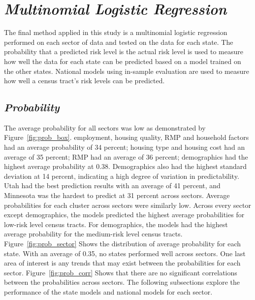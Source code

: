 \section{\textit{Multinomial Logistic Regression}}

The final method applied in this study is a multinomial logistic regression performed on each sector of data and tested on the data for each state. The probability that a predicted risk level is the actual risk level is used to measure how well the data for each state can be predicted based on a model trained on the other states. National models using in-sample evaluation are used to measure how well a census tract's risk levels can be predicted.

\subsection{\textit{Probability}}

The average probability for all sectors was low as demonstrated by Figure~\ref{fig:prob_box}. employment, housing quality, RMP and household factors had an average probability of 34 percent; housing type and housing cost had an average of 35 percent; RMP had an average of 36 percent; demographics had the highest average probability at 0.38. Demographics also had the highest standard deviation at 14 percent, indicating a high degree of variation in predictability. Utah had the best prediction results with an average of 41 percent, and Minnesota was the hardest to predict at 31 percent across sectors. Average probabilities for each cluster across sectors were similarly low. Across every sector except demographics, the models predicted the highest average probabilities for low-risk level census tracts. For demographics, the models had the highest average probability for the medium-risk level census tracts. Figure~\ref{fig:prob_sector} Shows the distribution of average probability for each state. With an average of 0.35, no states performed well across sectors. One last area of interest is any trends that may exist between the probabilities for each sector. Figure~\ref{fig:prob_corr} Shows that there are no significant correlations between the probabilities across sectors. The following subsections explore the performance of the state models and national models for each sector. 


